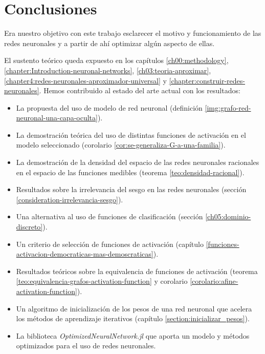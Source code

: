 
\chapter{Conclusiones} 

Era nuestro objetivo con este trabajo esclarecer 
el motivo y funcionamiento de las redes neuronales y 
a partir de ahí optimizar algún aspecto de ellas. 

El sustento teórico queda expuesto en los capítulos 
\ref{ch00:methodology}, \ref{chapter:Introduction-neuronal-networks},
\ref{ch03:teoria-aproximar}, \ref{chapter4:redes-neuronales-aproximador-universal}
y \ref{chapter:construir-redes-neuronales}. 
Hemos contribuido al estado del arte actual con los 
resultados: 

\begin{itemize}
    \item La propuesta del uso de modelo de red neuronal (definición \ref{img:grafo-red-neuronal-una-capa-oculta}).
    \item La demostración teórica del uso de distintas funciones de activación en 
    el modelo seleccionado (corolario \ref{cor:se-generaliza-G-a-una-familia}). 
    \item La demostración de la densidad del espacio de las redes neuronales racionales en el espacio de las funciones medibles (teorema \ref{teo:densidad-racional}).
    \item Resultados sobre la irrelevancia del sesgo en las redes neuronales (sección \ref{consideration-irrelevancia-sesgo}).
    \item Una alternativa al uso de funciones de clasificación (sección \ref{ch05:dominio-discreto}).
    \item Un criterio de selección de funciones de activación (capítulo \ref{funciones-activacion-democraticas-mas-demoscraticas}).
    \item Resultados teóricos sobre la equivalencia de funciones de activación (teorema \ref{teo:equivalencia-grafos-activation-function} y 
    corolario \ref{corolario:afine-activation-function}).
    \item Un algoritmo de inicialización de los pesos de una red neuronal que acelera los métodos de aprendizaje iterativos (capítulo \ref{section:inicializar_pesos}).
    \item La biblioteca \textit{OptimizedNeuralNetwork.jl} que aporta un modelo y métodos optimizados para el uso de redes neuronales. 
\end{itemize}

